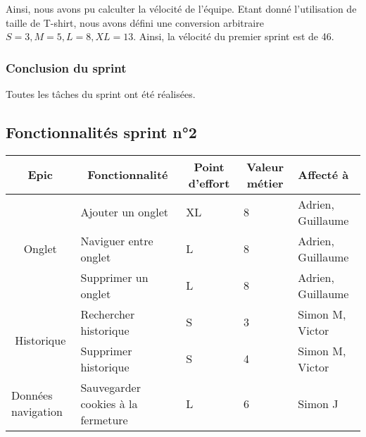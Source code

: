 \documentclass[10pt,a4paper]{article}
\begin{document}
Ainsi, nous avons pu calculter la vélocité de l'équipe. Etant donné l'utilisation de taille de T-shirt, nous avons défini une conversion arbitraire $S = 3, M = 5, L = 8, XL = 13$. Ainsi, la vélocité du premier sprint est de 46.

\subsubsection{Conclusion du sprint}
Toutes les tâches du sprint ont été réalisées. 

\subsection{Fonctionnalités sprint n°2}

\begin{table}[h]
\begin{tabular}{|c|l|l|l|l|}
\hline
\textbf{Epic}                            & \multicolumn{1}{c|}{\textbf{Fonctionnalité}} & \multicolumn{1}{c|}{\textbf{Point d'effort}} & \multicolumn{1}{c|}{\textbf{Valeur métier}} & \textbf{Affecté à} \\ \hline
\multirow{3}{*}{Onglet}                  & Ajouter un onglet                            & XL                                           & 8                                           & Adrien, Guillaume  \\ \cline{2-5} 
                                         & Naviguer entre onglet                        & L                                            & 8                                           & Adrien, Guillaume  \\ \cline{2-5} 
                                         & Supprimer un onglet                          & L                                            & 8                                           & Adrien, Guillaume  \\ \hline
\multirow{2}{*}{Historique}              & Rechercher historique                        & S                                            & 3                                           & Simon M, Victor    \\ \cline{2-5} 
                                         & Supprimer historique                         & S                                            & 4                                           & Simon M, Victor    \\ \hline
\multicolumn{1}{|l|}{Données navigation} & Sauvegarder cookies à la fermeture           & L                                            & 6                                           & Simon J            \\ \hline
\end{tabular}
\end{table}
\end{document}
